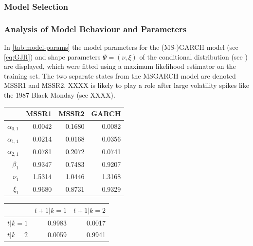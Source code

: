 \documentclass[11pt,a4paper]{article}
\begin{document}
\subsubsection{Model Selection}


\subsubsection{Analysis of Model Behaviour and Parameters}
In \cref{tab:model-params} the model parameters for the (MS-)GARCH model (see \cref{eq:GJR}) and shape parameters $\Psi = (\nu, \xi)$ of the conditional distribution (see ) are displayed, which were fitted using a maximum likelihood estimator on the training set. 
The two separate states from the MSGARCH model are denoted MSSR1 and MSSR2.
XXXX is likely to play a role after large volatility spikes like the 1987 Black Monday (see XXXX).

\vspace{0.5cm}
\begin{minipage}[c]{0.5\textwidth}
	\begin{tabular}{rrrr}
		\hline
		& MSSR1 & MSSR2 & GARCH \\ 
		\hline
		$\alpha_{0,1}$ & 0.0042 & 0.1680 & 0.0082 \\ 
		$\alpha_{1,1}$ & 0.0214 & 0.0168 & 0.0356 \\ 
		$\alpha_{2,1}$ & 0.0781 & 0.2072 & 0.0741 \\ 
		$\beta_1$ & 0.9347 & 0.7483 & 0.9207 \\ 
		$\nu_1$ & 1.5314 & 1.0446 & 1.3168 \\ 
		$\xi_1$ & 0.9680 & 0.8731 & 0.9329 \\ 
		\hline
	\end{tabular}
	 \label{tab:model-params}
\end{minipage}
\begin{minipage}[c]{0.5\textwidth}
	\begin{tabular}{lrr} 
		\hline
		& $t+1 | k=1$ & $t+1 | k=2$ \\
		\hline
		$t | k=1$ & 0.9983 & 0.0017 \\
		$t | k=2$ & 0.0059 & 0.9941 \\
		\hline
	\end{tabular}
 	\label{tab:trans-probs}
\end{minipage}
\vspace{0.5cm}
\end{document}
